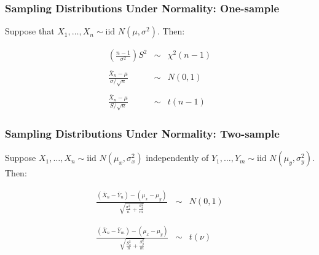\begin{frame}
\frametitle{Sampling Distributions Under Normality: One-sample}
Suppose that $X_1, \hdots, X_n \sim \mbox{iid } N(\mu,\sigma^2)$. Then:

	\begin{eqnarray*}
		\left(\frac{n-1}{\sigma^2}\right) S^2&\sim&\chi^2(n-1)\\ \\
		\frac{\bar{X}_n-\mu}{\sigma/\sqrt{n}}&\sim& N(0,1)\\ \\
		\frac{\bar{X}_n-\mu}{S/\sqrt{n}}&\sim&t(n-1)
	\end{eqnarray*}
\end{frame}
\begin{frame}
\frametitle{Sampling Distributions Under Normality: Two-sample}
Suppose $X_1, \hdots, X_{n} \sim \mbox{iid } N(\mu_x, \sigma^2_x)$ independently of $Y_1, \hdots, Y_{m} \sim \mbox{iid } N(\mu_y, \sigma^2_y)$. Then:


	\begin{eqnarray*}
\frac{(\bar{X}_n - \bar{Y}_n) - (\mu_x -\mu_y)}{\sqrt{\displaystyle\frac{\sigma_x^2}{n} + \frac{\sigma_y^2}{m} }} &\sim& N(0,1) \\ \\ \\
		\frac{\left(\bar{X}_n - \bar{Y}_m\right) - (\mu_x - \mu_y)}{\sqrt{\displaystyle\frac{S_x^2}{n} + \frac{S_y^2}{m} }}&\sim& t(\nu)
	\end{eqnarray*}
\end{frame}

